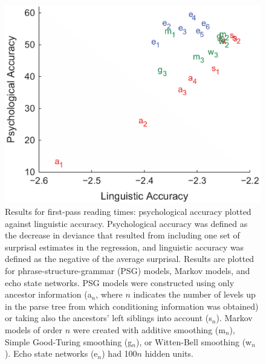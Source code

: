 \begin{figure}[!ht]
    \centering
    \captionsetup{width=.8\linewidth}
    \includegraphics[width=0.4\linewidth]{images/frank_2.png}
    \caption{Results for first-pass reading times: psychological accuracy plotted against linguistic accuracy. Psychological accuracy was defined as the decrease in deviance that resulted from including one set of surprisal estimates in the regression, and linguistic accuracy was defined as the negative of the average surprisal. Results are plotted for phrase-structure-grammar (PSG) models, Markov models, and echo state networks. PSG models were constructed using only ancestor information (a$_n$, where $n$ indicates the number of levels up in the parse tree from which conditioning information was obtained) or taking also the ancestors' left siblings into account (s$_n$). Markov models of order $n$ were created with additive smoothing (m$_n$), Simple Good-Turing smoothing (g$_n$), or Witten-Bell smoothing (w$_n$). Echo state networks (e$_n$) had 100$n$ hidden units.}
    \label{fig:frank_2}
\end{figure}


